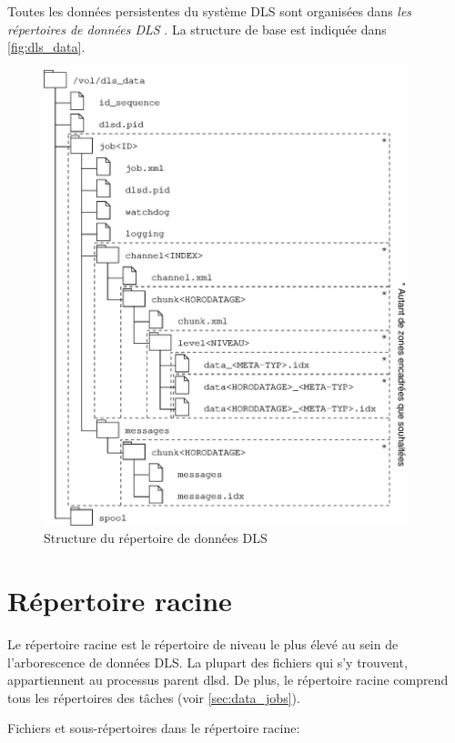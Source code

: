 \documentclass[a4paper,12pt,BCOR6mm,bibtotoc,idxtotoc]{scrbook}
\begin{document}
Toutes les donn\'ees persistentes du syst\`eme DLS sont organis\'ees
dans \textit{les r\'epertoires de donn\'ees DLS }. La structure de base est indiqu\'ee dans
\autoref{fig:dls_data}.

\begin{figure}[htb]
  \begin{center}
    \includegraphics[width=300pt]{bilder/dls_data_fr}
  \end{center}
  \caption{Structure du r\'epertoire de donn\'ees DLS}
  \label{fig:dls_data}
\end{figure}


\section{R\'epertoire racine}
\label{sec:data_root}

Le r\'epertoire racine est le r\'epertoire de niveau le plus \'elev\'e
au sein de l'arborescence de donn\'ees DLS.  La plupart des fichiers
qui s'y trouvent, appartiennent au processus parent dlsd. De plus, le
r\'epertoire racine comprend tous les r\'epertoires des t\^aches
(voir \autoref{sec:data_jobs}).

Fichiers et sous-r\'epertoires dans le r\'epertoire racine:
\end{document}
